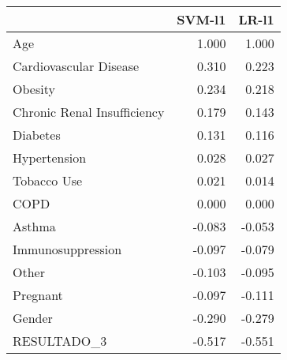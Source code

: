 \begin{tabular}{lrr}
\toprule
{} &  SVM-l1 &  LR-l1 \\
\midrule
Age                         &   1.000 &  1.000 \\
Cardiovascular Disease      &   0.310 &  0.223 \\
Obesity                     &   0.234 &  0.218 \\
Chronic Renal Insufficiency &   0.179 &  0.143 \\
Diabetes                    &   0.131 &  0.116 \\
Hypertension                &   0.028 &  0.027 \\
Tobacco Use                 &   0.021 &  0.014 \\
COPD                        &   0.000 &  0.000 \\
Asthma                      &  -0.083 & -0.053 \\
Immunosuppression           &  -0.097 & -0.079 \\
Other                       &  -0.103 & -0.095 \\
Pregnant                    &  -0.097 & -0.111 \\
Gender                      &  -0.290 & -0.279 \\
RESULTADO\_3                 &  -0.517 & -0.551 \\
\bottomrule
\end{tabular}
